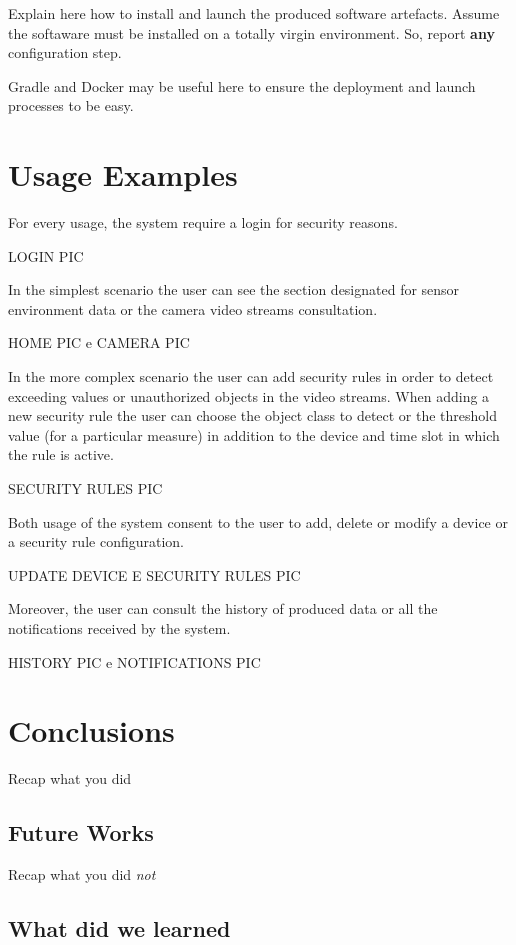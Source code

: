\documentclass{scrartcl}
\begin{document}
    Explain here how to install and launch the produced software artefacts.
%
    Assume the softaware must be installed on a totally virgin environment.
%
    So, report \textbf{any} configuration step.

    Gradle and Docker may be useful here to ensure the deployment and launch processes to be easy.


    \section{Usage Examples}

    For every usage, the system require a login for security reasons.

    LOGIN PIC

    In the simplest scenario the user can see the section designated for sensor environment data or the camera video streams consultation.

    HOME PIC e CAMERA PIC

    In the more complex scenario the user can add security rules in order to detect exceeding values or unauthorized objects in the video streams.
    When adding a new security rule the user can choose the object class to detect or the threshold value (for a particular measure) in addition to the device and time slot in which the rule is active.

    SECURITY RULES PIC

    Both usage of the system consent to the user to add, delete or modify a device or a security rule configuration.

    UPDATE DEVICE E SECURITY RULES PIC

    Moreover, the user can consult the history of produced data or all the notifications received by the system.

    HISTORY PIC e NOTIFICATIONS PIC


    \section{Conclusions}

    Recap what you did

    \subsection{Future Works}

    Recap what you did \emph{not}

    \subsection{What did we learned}
\end{document}
